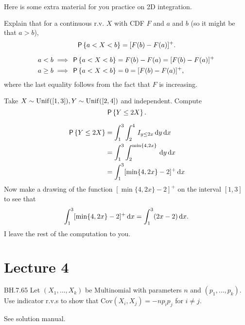 Here is some extra material for you practice on 2D integration.
\begin{exercise}
Explain that for a continuous r.v. $X$ with CDF $F$ and $a$ and $b$ (so it might be that $a>b$),
\begin{equation}
  \label{eq:7}
\P{a< X < b} = [F(b) - F(a)]^{+}.
\end{equation}
\begin{solution}
\begin{align}
a<b & \implies \P{a< X < b} = F(b) - F(a) = [F(b) - F(a)]^{+} \\
a\geq b & \implies \P{a< X < b} =  0 = [F(b) - F(a)]^{+},
\end{align}
where the last equality follows from the fact that $F$ is increasing.
\end{solution}
\end{exercise}

\begin{exercise}
Take $X\sim\Unif{[1,3]}, Y\sim\Unif{[2,4]}$ and independent. Compute
\begin{equation}
  \label{eq:24}
\P{Y\leq 2X}.
\end{equation}
\begin{solution}
\begin{align}
\P{Y\leq 2X}
&= \int_{1}^{3}\int_{2}^{4} \1{y\leq 2x} \d y \d x \\
&= \int_{1}^{3}\int_{2}^{\min\{4, 2x\}} \d y \d x\\
&= \int_{1}^{3} [\min\{4, 2x\} -2]^{+} \d x
\end{align}
Now make a drawing of the function $[\min\{4, 2x\} - 2]^{+}$ on the interval $[1,3]$ to see that
\begin{align}
\int_{1}^{3} [\min\{4, 2x\} -2]^{+} \d x = \int_{1}^{3} (2x -2) \d x.
\end{align}
I leave the rest of the computation to you.
\end{solution}
\end{exercise}

\section{Lecture 4}

\newcommand{\corrr}{\text{Corr}}
\newcommand{\covv}{\text{Cov}}


\begin{exercise} BH.7.65 Let $(X_1, \ldots, X_k)$ be Multinomial with parameters $n$ and $(p_1, \ldots, p_k)$. Use indicator r.v.s to show that $\covv(X_i, X_j) = -n p_i p_j$ for $i \neq j$.

\begin{solution}
See solution manual.
\end{solution}
\end{exercise}


